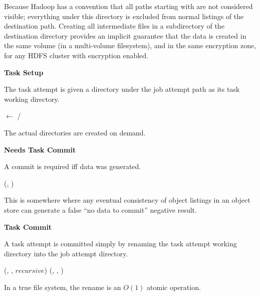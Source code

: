 \documentclass[conference]{IEEEtran}
\begin{document}
Because Hadoop has a convention that all paths starting with \textunderscore are not considered
visible; 
everything under this directory is excluded from normal
listings of the destination path.
Creating all intermediate files in a subdirectory of the destination
directory provides an implicit guarantee that the data is created in the
same volume (in a multi-volume filesystem), and in the same encryption zone,
for any HDFS cluster with encryption enabled.


\textbf{Task Setup}

The task attempt is given a directory under the job attempt path
as its task working directory.

\begin{procedure}
\FileOutputCommitVars

  \taskAttemptPath $\longleftarrow$ \jobAttemptPath/\taskAttemptId\;

\caption{setupTask()}
\label{alg:FileOutputCommitter.setupTask}
\end{procedure}

The actual directories are created on demand.


\textbf{Needs Task Commit}

A commit is required iff data was generated.

\begin{function}
\FileOutputCommitVars

  \exists(\fs, \taskAttemptPath)\;

\caption{needsTaskCommit()}
\label{alg:FileOutputCommitter.needsTaskCommit}
\end{function}

This is somewhere where any eventual consistency of object listings in an object
store can generate a false ``no data to commit'' negative result.

\textbf{Task Commit}

A task attempt is committed simply by renaming the task attempt working directory
into the job attempt directory.

\begin{procedure}
\FileOutputCommitVars

  \If{\exists(\fs, \taskAttemptPath)} {
    \delete(\fs, \taskCommittedPath, $recursive$)\;
    \rename(\fs, \taskAttemptPath, \taskCommittedPath)\;
  }

\caption{commitTask()}
\label{alg:FileOutputCommitter.commitTask}
\end{procedure}


In a true file system, the rename is an $O(1)$ atomic operation.
\end{document}
